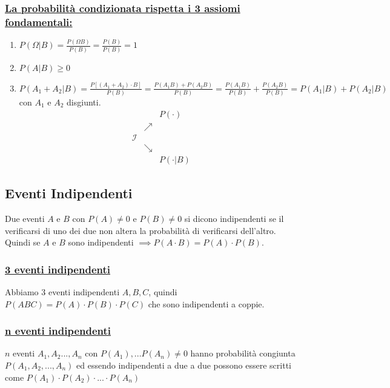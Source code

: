\documentclass{article}
\begin{document}
\subsubsection{\underline{La probabilità condizionata rispetta i 3 assiomi fondamentali:}}
\begin{enumerate}
    \item $P(\Omega | B) = \frac{P(\Omega B)}{P(B)} = \frac{P(B)}{P(B)} = 1$
    \item $P(A|B) \geq 0$
    \item $P(A_1+A_2 |B) = \frac{P[(A_1+A_2)\cdot B]}{P(B)} = \frac{P(A_1B) + P(A_2B)}{P(B)} = \frac{P(A_1B)}{P(B)} + \frac{P(A_2B)}{P(B)} = P(A_1|B)+P(A_2|B)$ con $A_1$ e $A_2$ disgiunti. \\
    \[\begin{matrix}
    & & P(\cdot) \\
     & \nearrow & & \\
    \mathcal{I} & && \\
     & \searrow & &\\
    & & P(\cdot |B)
    \end{matrix}\]
\end{enumerate}

\subsection{Eventi Indipendenti}
Due eventi $A$ e $B$ con $P(A)\neq0$ e $P(B)\neq0$ si dicono indipendenti se il verificarsi di uno dei due non altera la probabilità di verificarsi dell'altro. \\
Quindi se $A$ e $B$ sono indipendenti $\implies P(A\cdot B)=P(A)\cdot P(B)$.

\subsubsection{\underline{3 eventi indipendenti}}
Abbiamo 3 eventi indipendenti $A,B,C$, quindi
$P(ABC)=P(A)\cdot P(B)\cdot P(C)$ che sono indipendenti a coppie.

\subsubsection{\underline{n eventi indipendenti}}
$n$ eventi $A_1,A_2...,A_n$ con $P(A_1),...P(A_n)\neq0$ hanno probabilità congiunta
$P(A_1,A_2,...,A_n)$ ed essendo indipendenti a due a due possono essere
scritti come $P(A_1)\cdot P(A_2)\cdot...\cdot P(A_n)$
\end{document}
